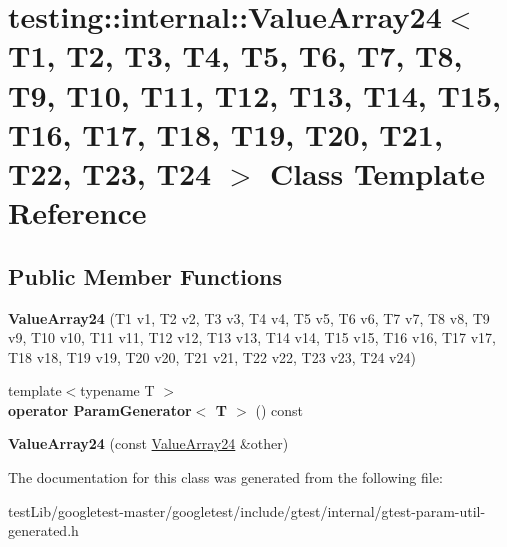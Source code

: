 \hypertarget{classtesting_1_1internal_1_1ValueArray24}{}\section{testing\+:\+:internal\+:\+:Value\+Array24$<$ T1, T2, T3, T4, T5, T6, T7, T8, T9, T10, T11, T12, T13, T14, T15, T16, T17, T18, T19, T20, T21, T22, T23, T24 $>$ Class Template Reference}
\label{classtesting_1_1internal_1_1ValueArray24}
\subsection*{Public Member Functions}
\begin{DoxyCompactItemize}
\item 
\mbox{\label{classtesting_1_1internal_1_1ValueArray24_abee2a51b2ed37f05ccecf7f2d5f43106}} 
{\bfseries Value\+Array24} (T1 v1, T2 v2, T3 v3, T4 v4, T5 v5, T6 v6, T7 v7, T8 v8, T9 v9, T10 v10, T11 v11, T12 v12, T13 v13, T14 v14, T15 v15, T16 v16, T17 v17, T18 v18, T19 v19, T20 v20, T21 v21, T22 v22, T23 v23, T24 v24)
\item 
\mbox{\label{classtesting_1_1internal_1_1ValueArray24_a6832c33cb80f6e0ff5fd0c557e743442}} 
{\footnotesize template$<$typename T $>$ }\\{\bfseries operator Param\+Generator$<$ T $>$} () const
\item 
\mbox{\label{classtesting_1_1internal_1_1ValueArray24_ae0e1f56f53518702e36b7b425c5513c6}} 
{\bfseries Value\+Array24} (const \hyperlink{classtesting_1_1internal_1_1ValueArray24}{Value\+Array24} \&other)
\end{DoxyCompactItemize}


The documentation for this class was generated from the following file\+:\begin{DoxyCompactItemize}
\item 
test\+Lib/googletest-\/master/googletest/include/gtest/internal/gtest-\/param-\/util-\/generated.\+h\end{DoxyCompactItemize}
